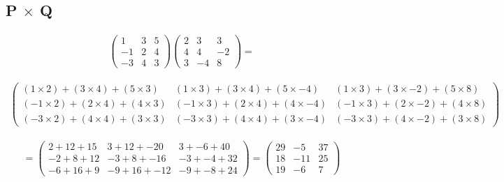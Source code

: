 \documentclass[a4paper,10pt]{article}
\begin{document}
    \subsection{P $\times$ Q}
      \begin{align*}
        \begin{pmatrix}
          1 & 3 & 5\\
          -1 & 2 & 4\\
          -3 & 4 & 3
        \end{pmatrix}
        \begin{pmatrix}
          2 & 3 & 3\\
          4 & 4 & -2\\
          3 & -4 & 8
        \end{pmatrix}
        =
      \end{align*}
      \begin{footnotesize}
        \begin{align*}
          \begin{pmatrix}
            ( 1 \times 2) + (3 \times 4) + (5 \times 3) & ( 1 \times 3) + (3 \times 4) + (5 \times -4) & ( 1 \times 3) + (3 \times -2) + (5 \times 8)\\
            (-1 \times 2) + (2 \times 4) + (4 \times 3) & (-1 \times 3) + (2 \times 4) + (4 \times -4) & (-1 \times 3) + (2 \times -2) + (4 \times 8)\\
            (-3 \times 2) + (4 \times 4) + (3 \times 3) & (-3 \times 3) + (4 \times 4) + (3 \times -4) & (-3 \times 3) + (4 \times -2) + (3 \times 8)
          \end{pmatrix}
        \end{align*}
      \end{footnotesize}
      \begin{align*}
        =
        \begin{pmatrix}
          2 + 12 + 15 & 3 + 12 + -20 & 3 + -6 + 40\\
          -2 + 8 + 12 & -3 + 8 + -16 & -3 + -4 + 32\\
          -6 + 16 + 9 & -9 + 16 + -12 & -9 + -8 + 24
        \end{pmatrix}
        =
        \begin{pmatrix}
          29 & -5 & 37\\
          18 & -11 & 25\\
          19 & -6 & 7
        \end{pmatrix}
      \end{align*}
\end{document}
